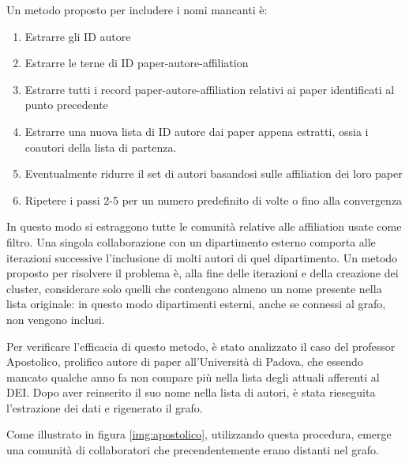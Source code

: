 \documentclass[12pt,a4paper,twoside]{report}
\begin{document}
Un metodo proposto per includere i nomi mancanti è:
\begin{enumerate}[noitemsep, topsep=0pt]
\item
Estrarre gli ID autore
\item
Estrarre le terne di ID paper-autore-affiliation
\item
Estrarre tutti i record paper-autore-affiliation relativi ai paper identificati al punto precedente
\item
Estrarre una nuova lista di ID autore dai paper appena estratti, ossia i coautori della lista di
partenza.
\item
Eventualmente ridurre il set di autori basandosi sulle affiliation dei loro paper
\item
Ripetere i passi 2-5 per un numero predefinito di volte o fino alla convergenza
\end{enumerate}

In questo modo si estraggono tutte le comunità relative alle affiliation usate come filtro. Una
singola collaborazione con un dipartimento esterno comporta alle iterazioni successive l'inclusione
di molti autori di quel dipartimento. Un metodo proposto per risolvere il problema è, alla fine delle
iterazioni e della creazione dei cluster, considerare solo quelli che contengono almeno un nome
presente nella lista originale: in questo modo dipartimenti esterni, anche se connessi al grafo, non
vengono inclusi.

Per verificare l'efficacia di questo metodo, è stato analizzato il caso del professor Apostolico,
prolifico autore di paper all'Università di Padova, che essendo mancato qualche anno fa non compare
più nella lista degli attuali afferenti al DEI. Dopo aver reinserito il suo nome nella lista di
autori, è stata rieseguita l'estrazione dei dati e rigenerato il grafo.

Come illustrato in figura \ref{img:apostolico}, utilizzando questa procedura, emerge una comunità di
collaboratori che precendentemente erano distanti nel grafo.
\end{document}
